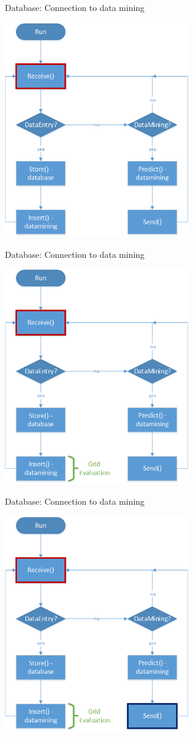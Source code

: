 	\begin{frame}{Database: Connection to data mining}
		\begin{center}
	\includegraphics[height=0.64\textwidth, width=0.6\textwidth]{images/datamining_flow0.png}
	\end{center}
	\end{frame}
	
	\begin{frame}{Database: Connection to data mining}
		\begin{center}
	\includegraphics[height=0.64\textwidth, width=0.6\textwidth]{images/datamining_flow2.png}
	\end{center}
	\end{frame}
	
	\begin{frame}{Database: Connection to data mining}
		\begin{center}
	\includegraphics[height=0.64\textwidth, width=0.6\textwidth]{images/datamining_flow3.png}
	\end{center}
	\end{frame}
